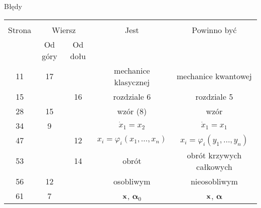 \documentclass[a4paper,11pt]{article}
\numberwithin{equation}{section}
\begin{document}
Błędy
\begin{center}
  \begin{tabular}{|c|c|c|c|c|}
    \hline
    & \multicolumn{2}{c|}{} & & \\
    Strona & \multicolumn{2}{c|}{Wiersz} & Jest
                              & Powinno być \\ \cline{2-3}
    & Od góry & Od dołu & & \\
    \hline
    11  & 17 & & mechanice klasycznej & mechanice kwantowej \\
    15  & & 16 & rozdziale 6 & rozdziale 5 \\
    28  & 15 & & wzór (8) & wzór \\
    34  &  9 & & $\dot{ x }_{ 1 } = x_{ 2 }$ & $\dot{ x }_{ 1 } = x_{ 1 }$ \\
    47  & & 12 & $x_{ i } = \varphi_{ i }( x_{ 1 }, \ldots, x_{ n } )$
           & $x_{ i } = \varphi_{ i }( y_{ 1 }, \ldots, y_{ n } )$ \\
    53  & & 14 & obrót & obrót krzywych całkowych \\
    56  & 12 & & osobliwym & nieosobliwym \\
    61  &  7 & & $\mathbf{x}$, $\boldsymbol{\alpha}_{ 0 }$
           & $\mathbf{x}$, $\boldsymbol{\alpha}$ \\
    \hline
  \end{tabular}
\end{center}
\end{document}
